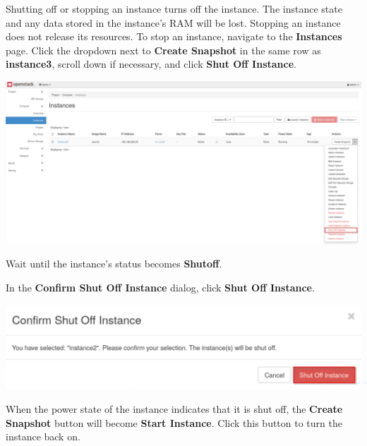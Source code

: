 \documentclass[letterpaper, 12pt]{article}
\begin{document}
\begin{enumerate}
    \begin{labstep}
        Shutting off or stopping an instance turns off the instance.
        The instance state and any data stored in the instance's RAM will be lost.
        Stopping an instance does not release its resources.
        To stop an instance, navigate to the \textbf{Instances} page.
        Click the dropdown next to \textbf{Create Snapshot} in the same row as \textbf{instance3}, scroll down if necessary, and click \textbf{Shut Off Instance}.

        \begin{center}
            \includegraphics[width=\linewidth]{images/part3/step17.png}
        \end{center}
    \end{labstep}

    \begin{stopbox}
        Wait until the instance's status becomes \textbf{Shutoff}.
    \end{stopbox}

    \begin{labstep}
        In the \textbf{Confirm Shut Off Instance} dialog, click \textbf{Shut Off Instance}.

        \begin{center}
            \includegraphics[width=\linewidth]{images/part3/step18.png}
        \end{center}
    \end{labstep}

    \begin{labstep}
        When the power state of the instance indicates that it is shut off, the \textbf{Create Snapshot} button will become \textbf{Start Instance}.
        Click this button to turn the instance back on.


\end{labstep}
\end{enumerate}
\end{document}
